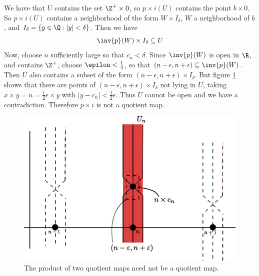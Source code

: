 \begin{example}
\begin{enumerate}
            We have that $U$ contains the set  $\Z^+ \times 0$, so $p \times
            i(U)$ contains the point $b \times 0$. So  $p \times i(U)$ contains
            a neighborhood of the form $W \times I_\delta$,  $W$ a neighborhood
            of  $b$, and  $I_\delta=\{y \in \Q : |y|<\delta\}$. Then we have
            \begin{equation*}
                \inv{p}(W) \times I_\delta \subseteq U
            \end{equation*}
            Now, choose $n$ sufficiently large so that  $c_n<\delta$. Since
            $\inv{p}(W)$ is open in $\R$, and contains $\Z^+$, choose
            $\epilon<\frac{1}{4}$, so that $(n-\epsilon,n+\epsilon) \subseteq
            \inv{p}(W)$. Then $U$ also contains a subset of the form
            $(n-\epsilon,n+\epsilon) \times I_\delta$. But figure \ref{fig_2.8}
            shows that there are points of $(n-\epsilon,n+\epsilon) \times
            I_\delta$ not lying in $U$, taking  $x \times
            y=n=\frac{1}{2}\epsilon \times y$ with
            $|y-c_n|<\frac{1}{2}\epsilon$. Thus $U$ cannot be open and we have a
            contradiction. Therefore $p \times i$ is not a quotient map.

            \begin{figure}[h]
                \centering
                \includegraphics[scale=0.5]{Figures/chapter2/figure22_8.eps}
                \caption{The product of two quotient maps need not be a quotient
                map.}
                \label{fig_2.8}
            \end{figure}
    \end{enumerate}
\end{example}

